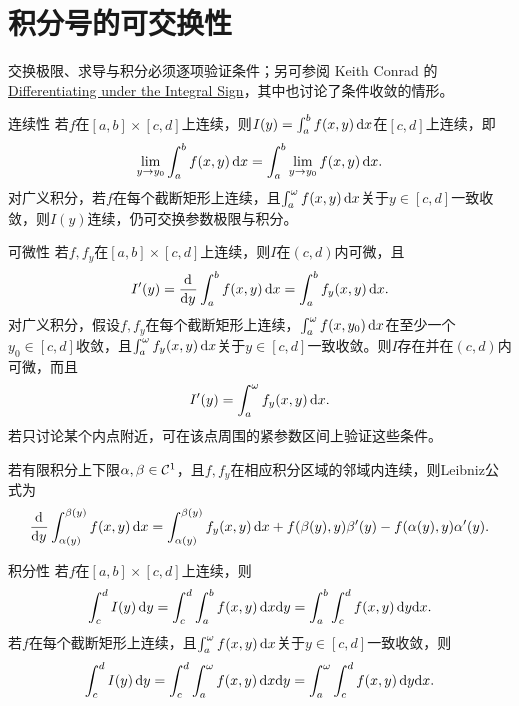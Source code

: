 \section{积分号的可交换性}
交换极限、求导与积分必须逐项验证条件；另可参阅 Keith Conrad 的\href{https://kconrad.math.uconn.edu/blurbs/analysis/diffunderint.pdf}{Differentiating under the Integral Sign}，其中也讨论了条件收敛的情形。
\begin{theorem}{连续性}{}
    若$f$在$[a,b] \times [c,d]$上连续，则$\textstyle I(y) = \int_a^bf(x,y)\mathop{}\!\mathrm{d} x$在$[c,d]$上连续，即
    \begin{equation}\label{eq:calc-integral-continuity}
        \lim_{y\to y_0}\int_a^bf(x,y)\mathop{}\!\mathrm{d} x = \int_a^b\lim_{y\to y_0}f(x,y)\mathop{}\!\mathrm{d} x.
    \end{equation}
    \tcblower
    对广义积分，若$f$在每个截断矩形上连续，且$\textstyle \int_a^\omega f(x,y)\mathop{}\!\mathrm{d} x$关于$y \in [c,d]$一致收敛，则$I(y)$连续，仍可交换参数极限与积分。
\end{theorem}
\begin{theorem}{可微性}{}
    若$f,f_y$在$[a,b] \times [c,d]$上连续，则$I$在$(c,d)$内可微，且
    \begin{equation}\label{eq:calc-differentiation-under-integral}
        I'(y) = \frac{\mathop{}\!\mathrm{d}^{}}{\mathrm{d}{y}^{}}\int_a^bf(x,y)\mathop{}\!\mathrm{d} x = \int_a^bf_y(x,y)\mathop{}\!\mathrm{d} x.
    \end{equation}
    \tcblower
    对广义积分，假设$f,f_y$在每个截断矩形上连续，$\textstyle \int_a^\omega f(x,y_0)\mathop{}\!\mathrm{d} x$在至少一个$y_0 \in [c,d]$收敛，且$\textstyle \int_a^\omega f_y(x,y)\mathop{}\!\mathrm{d} x$关于$y \in [c,d]$一致收敛。则$I$存在并在$(c,d)$内可微，而且
    \begin{equation}\label{eq:calc-improper-integral-derivative}
        I'(y) = \int_a^\omega f_y(x,y)\mathop{}\!\mathrm{d} x.
    \end{equation}
    若只讨论某个内点附近，可在该点周围的紧参数区间上验证这些条件。
\end{theorem}
若有限积分上下限$\alpha,\beta \in \mathcal{C}^1$，且$f,f_y$在相应积分区域的邻域内连续，则Leibniz公式为
\begin{equation}\label{eq:calc-leibniz-rule}
    \frac{\mathop{}\!\mathrm{d}^{}}{\mathrm{d}{y}^{}}\int_{\alpha(y)}^{\beta(y)}f(x,y)\mathop{}\!\mathrm{d} x
    = \int_{\alpha(y)}^{\beta(y)}f_y(x,y)\mathop{}\!\mathrm{d} x + f(\beta(y),y)\beta'(y) - f(\alpha(y),y)\alpha'(y).
\end{equation}
\begin{theorem}{积分性}{}
    若$f$在$[a,b] \times [c,d]$上连续，则
    \begin{equation}\label{eq:calc-integral-interchange}
        \int_c^dI(y)\mathop{}\!\mathrm{d} y = \int_c^d\int_a^bf(x,y)\mathop{}\!\mathrm{d} x\mathrm{d} y
        = \int_a^b\int_c^df(x,y)\mathop{}\!\mathrm{d} y\mathrm{d} x.
    \end{equation}
    \tcblower
    若$f$在每个截断矩形上连续，且$\textstyle \int_a^\omega f(x,y)\mathop{}\!\mathrm{d} x$关于$y \in [c,d]$一致收敛，则
    \begin{equation}\label{eq:calc-improper-integral-interchange}
        \int_c^dI(y)\mathop{}\!\mathrm{d} y = \int_c^d\int_a^\omega f(x,y)\mathop{}\!\mathrm{d} x\mathrm{d} y
        = \int_a^\omega\int_c^df(x,y)\mathop{}\!\mathrm{d} y\mathrm{d} x.
    \end{equation}
\end{theorem}
